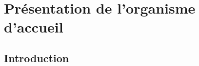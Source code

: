 

\chapter{Présentation de l'organisme d'accueil}
\thispagestyle{empty}


\newpage
\section*{Introduction}

